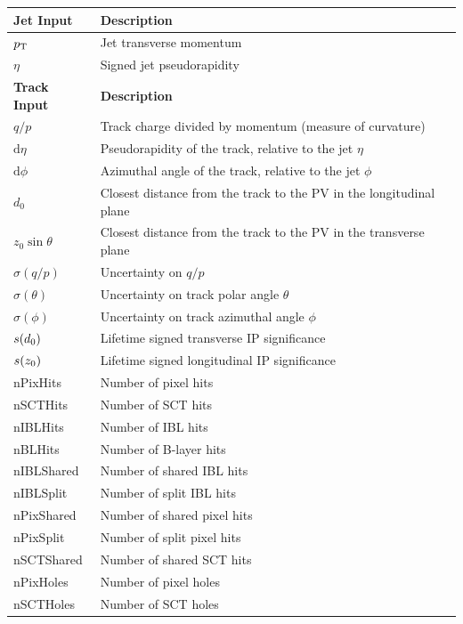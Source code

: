 \begin{table}[!htbp]
  \footnotesize\centering
  \setlength{\tabcolsep}{0.5em} %
  \begin{tabular}{ll}
    \toprule 
    \textbf{Jet Input} & \textbf{Description} \\
    \hline
    $p_{\text{T}}$ & Jet transverse momentum \\
    $\eta$ & Signed jet pseudorapidity \\
    \toprule
    \textbf{Track Input} & \textbf{Description} \\
    \hline
    $q/p$ & Track charge divided by momentum (measure of curvature) \\
    $\mathrm{d}\eta$ & Pseudorapidity of the track, relative to the jet $\eta$ \\
    $\mathrm{d}\phi$  & Azimuthal angle of the track, relative to the jet $\phi$ \\
    $d_0$  & Closest distance from the track to the PV in the longitudinal plane \\
    $z_0 \sin\theta$  & Closest distance from the track to the PV in the transverse plane \\
    $\sigma(q/p)$ & Uncertainty on $q/p$ \\
    $\sigma(\theta)$ & Uncertainty on track polar angle $\theta$ \\
    $\sigma(\phi)$  & Uncertainty on track azimuthal angle $\phi$ \\
    $s(d_0)$  & Lifetime signed transverse IP significance \\
    $s(z_0)$  & Lifetime signed longitudinal IP significance \\
    nPixHits   & Number of pixel hits \\
    nSCTHits   & Number of SCT hits \\
    nIBLHits   & Number of IBL hits \\
    nBLHits    & Number of B-layer hits \\
    nIBLShared & Number of shared IBL hits \\
    nIBLSplit  & Number of split IBL hits \\
    nPixShared & Number of shared pixel hits \\
    nPixSplit  & Number of split pixel hits \\
    nSCTShared & Number of shared SCT hits \\
    nPixHoles  & Number of pixel holes \\
    nSCTHoles  & Number of SCT holes \\

\end{tabular}
\end{table}
